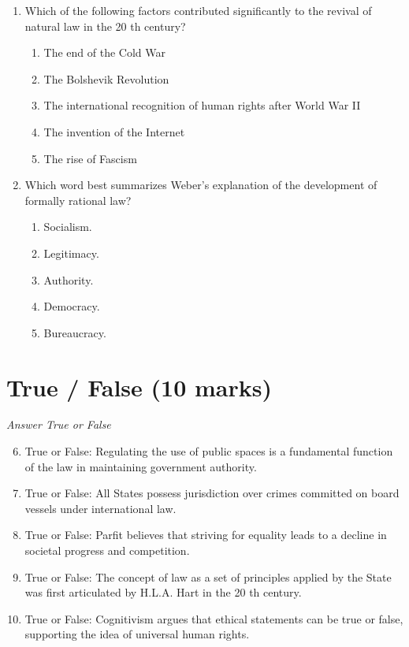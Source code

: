 \documentclass[12pt]{article}
\begin{document}
\begin{enumerate}[label=\arabic*.]
\begin{enumerate}[label=(\alph*)]
    \item The UK Constitution is based on a Bill of Rights
\end{enumerate}
\item Which of the following factors contributed significantly to the revival of natural law in the 20 th century?
\begin{enumerate}[label=(\alph*)]
    \item The end of the Cold War
    \item The Bolshevik Revolution
    \item The international recognition of human rights after World War II
    \item The invention of the Internet
    \item The rise of Fascism
\end{enumerate}
\item Which word best summarizes Weber's explanation of the development of formally rational law?
\begin{enumerate}[label=(\alph*)]
    \item Socialism.
    \item Legitimacy.
    \item Authority.
    \item Democracy.
    \item Bureaucracy.
\end{enumerate}
\end{enumerate}

\section*{True / False (10 marks)}
\textit{Answer True or False}
\begin{enumerate}[label=\arabic*.]
\setcounter{enumi}{5}
\item True or False: Regulating the use of public spaces is a fundamental function of the law in maintaining government authority.
\item True or False: All States possess jurisdiction over crimes committed on board vessels under international law.
\item True or False: Parfit believes that striving for equality leads to a decline in societal progress and competition.
\item True or False: The concept of law as a set of principles applied by the State was first articulated by H.L.A. Hart in the 20 th century.
\item True or False: Cognitivism argues that ethical statements can be true or false, supporting the idea of universal human rights.
\end{enumerate}
\end{document}
